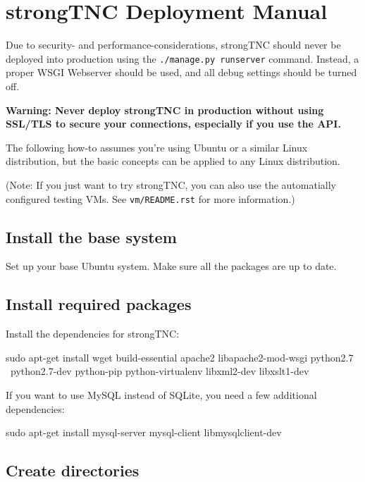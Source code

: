 \section{strongTNC Deployment Manual}
\label{anhang:deployment-manual}

Due to security- and performance-considerations, strongTNC should never be
deployed into production using the \texttt{./manage.py runserver} command.
Instead, a proper WSGI Webserver should be used, and all debug settings should
be turned off.

\textbf{Warning: Never deploy strongTNC in production without using SSL/TLS to
secure your connections, especially if you use the API.}

The following how-to assumes you're using Ubuntu or a similar Linux
distribution, but the basic concepts can be applied to any Linux distribution.

(Note: If you just want to try strongTNC, you can also use the automatially
configured testing VMs. See \texttt{vm/README.rst} for more information.)

\subsection*{Install the base system}

Set up your base Ubuntu system. Make sure all the packages are up to date.

\subsection*{Install required packages}

Install the dependencies for strongTNC:

\begin{bashcode}
sudo apt-get install wget build-essential apache2 libapache2-mod-wsgi python2.7 \
    python2.7-dev python-pip python-virtualenv libxml2-dev libxslt1-dev
\end{bashcode}

If you want to use MySQL instead of SQLite, you need a few additional
dependencies:

\begin{bashcode}
sudo apt-get install mysql-server mysql-client libmysqlclient-dev
\end{bashcode}

\subsection*{Create directories}

